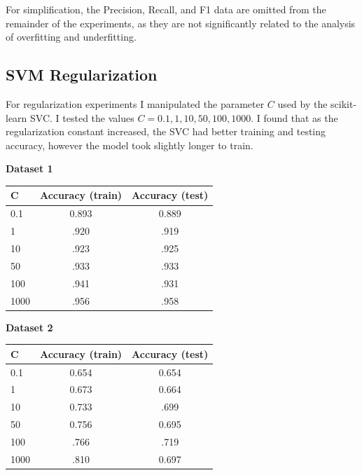 \documentclass{article}
\begin{document}
For simplification, the Precision, Recall, and F1 data are omitted from the remainder of the experiments, as they are not significantly related to the analysis of overfitting and underfitting.

\subsection{SVM Regularization}

For regularization experiments I manipulated the parameter $C$ used by the scikit-learn SVC. I tested the values $C=0.1, 1, 10, 50, 100, 1000$. I found that as the regularization constant increased, the SVC had better training and testing accuracy, however the model took slightly longer to train.

\begin{center}\textbf{Dataset 1}\end{center}
\begin{center}
\begin{tabular}{| l | c | c |}
    \hline
    \textbf{C} & \textbf{Accuracy (train)} & \textbf{Accuracy (test)} \\
    \hline
        0.1 & 0.893 & 0.889 \\
        1 & .920 & .919 \\
        10 & .923 & .925 \\
        50 & .933 & .933 \\
        100 & .941 & .931 \\
        1000 & .956 & .958 \\
    \hline
\end{tabular}
\end{center}

\begin{center}\textbf{Dataset 2}\end{center}
\begin{center}
\begin{tabular}{| l | c | c |}
    \hline
    \textbf{C} & \textbf{Accuracy (train)} & \textbf{Accuracy (test)} \\
    \hline
        0.1 & 0.654 & 0.654 \\
        1 & 0.673 & 0.664 \\
        10 & 0.733 & .699 \\
        50 & 0.756 & 0.695 \\
        100 & .766 & .719 \\
        1000 & .810 & 0.697 \\
    \hline
\end{tabular}\end{center}
\end{document}
